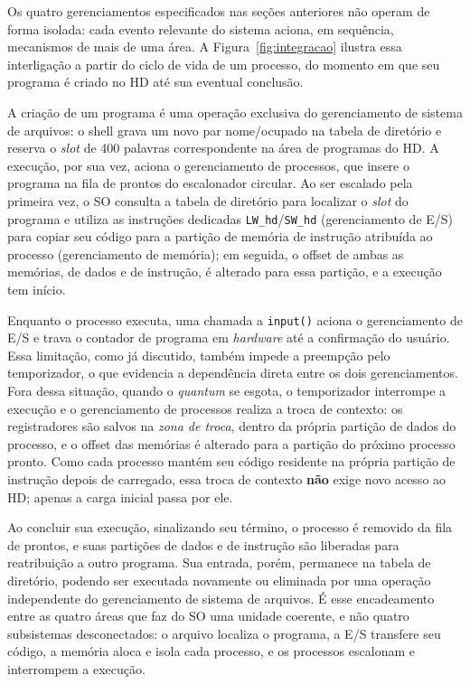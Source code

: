 \documentclass[
	12pt,				%
	openright,			%
	a4paper,			%
	english,			%
	french,				%
	spanish,			%
	brazilian,				%
	]{abntex2}
\begin{document}
Os quatro gerenciamentos especificados nas seções anteriores não operam de forma
isolada: cada evento relevante do sistema aciona, em sequência, mecanismos de mais
de uma área. A Figura~\ref{fig:integracao} ilustra essa interligação a partir do
ciclo de vida de um processo, do momento em que seu programa é criado no HD até sua
eventual conclusão.

A criação de um programa é uma operação exclusiva do gerenciamento de sistema de
arquivos: o shell grava um novo par nome/ocupado na tabela de diretório e reserva o
\emph{slot} de 400 palavras correspondente na área de programas do HD. A execução,
por sua vez, aciona o gerenciamento de processos, que insere o programa na fila de
prontos do escalonador circular. Ao ser escalado pela primeira vez, o SO consulta a
tabela de diretório para localizar o \emph{slot} do programa e utiliza as
instruções dedicadas \texttt{LW\_hd}/\texttt{SW\_hd} (gerenciamento de E/S) para
copiar seu código para a partição de memória de instrução atribuída ao processo
(gerenciamento de memória); em seguida, o offset de ambas as memórias, de dados e
de instrução, é alterado para essa partição, e a execução tem início.

Enquanto o processo executa, uma chamada a \texttt{input()} aciona o gerenciamento
de E/S e trava o contador de programa em \emph{hardware} até a confirmação do
usuário. Essa limitação, como já discutido, também impede a preempção pelo
temporizador, o que evidencia a dependência direta entre os dois gerenciamentos. Fora
dessa situação, quando o \emph{quantum} se esgota, o temporizador interrompe a execução e o
gerenciamento de processos realiza a troca de contexto: os registradores são
salvos na \emph{zona de troca}, dentro da própria partição de dados do processo, e o
offset das memórias é alterado para a partição do próximo processo pronto. Como
cada processo mantém seu código residente na própria partição de instrução depois
de carregado, essa troca de contexto \textbf{não} exige novo acesso ao HD; apenas
a carga inicial passa por ele.

Ao concluir sua execução, sinalizando seu término, o processo é removido da fila
de prontos, e suas partições de dados e de instrução são liberadas para
reatribuição a outro programa. Sua entrada, porém, permanece na tabela de
diretório, podendo ser executada novamente ou eliminada por uma operação
independente do gerenciamento de sistema de arquivos. É esse encadeamento entre
as quatro áreas que faz do SO uma unidade coerente, e não quatro subsistemas
desconectados: o arquivo localiza o programa, a E/S transfere seu código, a
memória aloca e isola cada processo, e os processos escalonam e interrompem a
execução.
\end{document}
